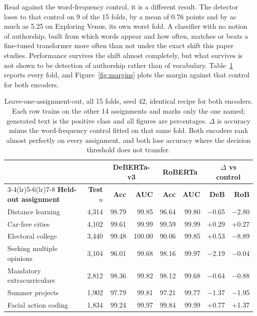 \documentclass{article}
\begin{document}
Read against the word-frequency control, it is a different result. The
detector loses to that control on 9 of the 15 folds, by a mean of 0.76
points and by as much as 5.25 on Exploring Venus, its own worst fold. A
classifier with no notion of authorship, built from which words appear and
how often, matches or beats a fine-tuned transformer more often than not
under the exact shift this paper studies. Performance survives the shift
almost completely, but what survives is not shown to be detection of
authorship rather than of vocabulary. Table~\ref{tab:loto} reports every fold, and
Figure~\ref{fig:margins} plots the margin against that control for both
encoders.

\begin{table}[tb]
\centering
\small
\caption{Leave-one-assignment-out, all 15 folds, seed 42, identical
recipe for both encoders. Each row trains on the other 14 assignments and
marks only the one named; generated text is the positive class and all
figures are percentages. $\Delta$ is accuracy minus the word-frequency
control fitted on that same fold. Both encoders rank almost perfectly on
every assignment, and both lose accuracy where the decision threshold does
not transfer.}
\label{tab:loto}
\begin{tabular}{@{}lrrrrrrr@{}}
\toprule
& & \multicolumn{2}{c}{\textbf{DeBERTa-v3}} & \multicolumn{2}{c}{\textbf{RoBERTa}}
& \multicolumn{2}{c}{\textbf{$\Delta$ vs control}} \\
\cmidrule(lr){3-4}\cmidrule(lr){5-6}\cmidrule(lr){7-8}
\textbf{Held-out assignment} & \textbf{Test $n$} & \textbf{Acc} & \textbf{AUC} & \textbf{Acc} & \textbf{AUC} & \textbf{DeB} & \textbf{RoB} \\
\midrule
Distance learning            & 4{,}314 & 98.79 & 99.85 & 96.64 & 99.80 & $-$0.65 & $-$2.80 \\
Car-free cities              & 4{,}102 & 99.61 & 99.99 & 99.59 & 99.99 & +0.29 & +0.27 \\
Electoral college            & 3{,}440 & 99.48 & 100.00 & 90.06 & 99.85 & +0.53 & $-$8.89 \\
Seeking multiple opinions    & 3{,}104 & 96.01 & 99.68 & 98.16 & 99.97 & $-$2.19 & $-$0.04 \\
Mandatory extracurriculars   & 2{,}812 & 98.36 & 99.82 & 98.12 & 99.68 & $-$0.64 & $-$0.88 \\
Summer projects              & 1{,}902 & 97.79 & 99.81 & 97.21 & 99.77 & $-$1.37 & $-$1.95 \\
Facial action coding         & 1{,}834 & 99.24 & 99.97 & 99.84 & 99.99 & +0.77 & +1.37 \\

\end{tabular}
\end{table}
\end{document}
